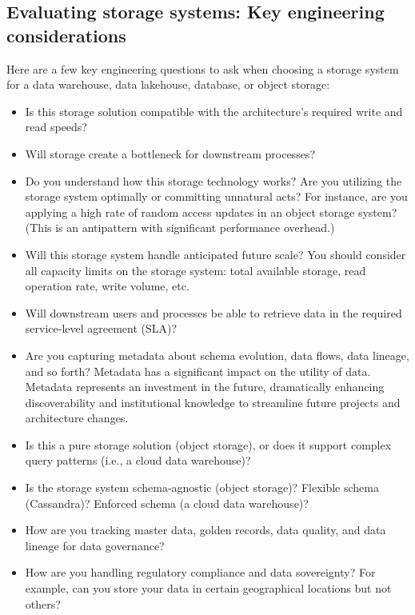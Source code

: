 \subsection*{Evaluating storage systems: Key engineering considerations}
Here are a few key engineering questions to ask when choosing a storage system for a
data warehouse, data lakehouse, database, or object storage:
\begin{itemize}
    \item Is this storage solution compatible with the architecture's required write and read speeds?
    \item Will storage create a bottleneck for downstream processes?
    \item Do you understand how this storage technology works? Are you utilizing the storage system optimally or committing unnatural acts? For instance, are you applying a high rate of random access updates in an object storage system? (This is an antipattern with significant performance overhead.)
    \item Will this storage system handle anticipated future scale? You should consider all capacity limits on the storage system: total available storage, read operation rate, write volume, etc.
    \item Will downstream users and processes be able to retrieve data in the required service-level agreement (SLA)?
    \item Are you capturing metadata about schema evolution, data flows, data lineage, and so forth? Metadata has a significant impact on the utility of data. Metadata represents an investment in the future, dramatically enhancing discoverability and institutional knowledge to streamline future projects and architecture changes.
    \item Is this a pure storage solution (object storage), or does it support complex query patterns (i.e., a cloud data warehouse)?
    \item Is the storage system schema-agnostic (object storage)? Flexible schema (Cassandra)? Enforced schema (a cloud data warehouse)?
    \item How are you tracking master data, golden records, data quality, and data lineage for data governance? 
    \item How are you handling regulatory compliance and data sovereignty? For example, can you store your data in certain geographical locations but not others?
\end{itemize}


